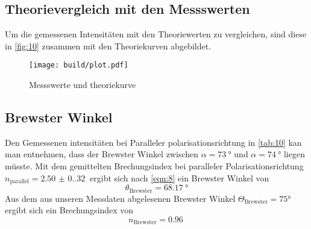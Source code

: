 \subsection{Theorievergleich mit den Messswerten}
Um die gemessenen Intensitäten mit den Theoriewerten zu vergleichen, sind 
diese in \autoref{fig:10} zusammen mit den Theoriekurven abgebildet. 
\begin{figure}[H]
  \centering 
  \caption{Messswerte und theoriekurve}
  \label{fig:10}
  \texttt{[image: build/plot.pdf]}
\end{figure}
\subsection{Brewster Winkel}
Den Gemessenen intensitäten bei Paralleler polarisationsrichtung in \autoref{tab:10} kan man entnehmen, dass 
der Brewster Winkel zwischen $\alpha = \qty{73}{\degree}$ und $\alpha = \qty{74}{\degree}$ liegen müsste. Mit dem 
gemittelten Brechungsindex bei paralleler Polarisationsrichtung $n_\text{parallel} = \qty{2.50(0.32)}{}$ ergibt sich nach \autoref{eqn:8}
ein Brewster Winkel von
\begin{equation}
 \theta_\text{Brewster} = \qty{68.17}{\degree}
\end{equation}
Aus dem aus unseren Messdaten abgelesenen Brewster Winkel $\Theta_\text{Brewster}=75\unit{\degree}$ ergibt sich 
ein Brechungsindex von  
\begin{equation}
 n_\text{Brewster} = \qty{0.96}{}
\end{equation}
